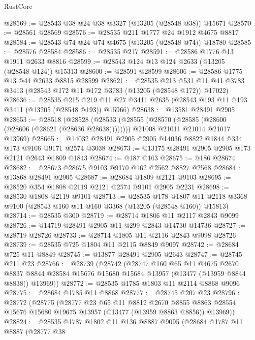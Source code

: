 \begin{lexlean}{RustCore}
\begin{coremodule}
@28569 := @28543 @38 @24 @38 @3327 (@13205 (@28548 @38)) @15671
@28570 := @28561 @28569
@28576 := @28535 @211 @1777 @24 @1912 @4675 @8817
@28584 := @28543 @74 @24 @74 @4675 (@13205 (@28548 @74)) @18780
@28585 := @28576 @28584
@28586 := @28535 @217
@28591 := @28586 @1776 @13 @1911 @2633 @8816
@28599 := @28543 @124 @13 @124 @2633 (@13205 (@28548 @124)) @15313
@28600 := @28591 @28599
@28606 := @28586 @1775 @13 @44 @2633 @8815 @28599
@28621 := @28535
    @213
    @531
    @11
    @41
    @3783
    @3413
    (@28543 @172 @11 @172 @3783 (@13205 (@28548 @172)) @17022)
@28636 := @28535
    @215
    @219
    @11
    @27
    @3411
    @2635
    (@28543 @193 @11 @193 @3411 (@13205 (@28548 @193)) @15966)
@28638 := @13581 @28491 @2905
@28653 := @28518
    (@28528
      (@28533 (@28555 (@28570 (@28585 (@28600 (@28606 (@28621 (@28636 @28638))))))))
      @21008
      @21011
      @21014
      @21017
      @13969)
@28665 := @14032 @28491 @2905 @2905 @14036 @8822 @1844 @334 @173 @9106 @9171 @2574 @3038
@28673 := @13175 @28491 @2905 @2905 @173 @2121 @2643 @1809 @1843
@28674 := @187 @163
@28675 := @186 @28674
@28682 := @28673 @28675 @9103 @9170 @162 @2562 @8827 @2568
@28684 := @13868 @28491 @2905
@28687 := @28684 @1809 @2121 @9103
@28695 := @28520 @354 @1808 @2119 @2121 @2574 @9101 @2905 @2231
@28698 := @28530 @1808 @2119 @9101
@28713 := @28535
    @178
    @1807
    @11
    @2118
    @3368
    @9100
    (@28543 @160 @11 @160 @3368 (@13205 (@28548 @160)) @15813)
@28714 := @28535 @300
@28719 := @28714 @1806 @11 @2117 @2843 @9099
@28726 := @14719 @28491 @2905 @11 @299 @2843 @14730 @14736
@28727 := @28719 @28726
@28733 := @28714 @1805 @11 @2116 @2843 @9098 @28726
@28739 := @28535 @725 @1804 @11 @2115 @8849 @9097
@28742 := @28684 @725 @11 @8849
@28745 := @13877 @28491 @2905 @2643
@28747 := @28745 @211 @23
@28766 := @28739
    (@28742
      (@28747
        @160
        @65
        @11
        @4675
        @2670
        @8837
        @8844
        @28584
        @15676
        @15680
        @15684
        @13957
        (@13477 (@13959 @8844 @8838))
        @13969))
@28772 := @28535 @1785 @1803 @11 @2114 @8868 @9096
@28775 := @28684 @1785 @11 @8868
@28777 := @28745 @207 @23
@28796 := @28772
    (@28775
      (@28777
        @23
        @65
        @11
        @8812
        @2670
        @8855
        @8863
        @28554
        @15676
        @15680
        @19675
        @13957
        (@13477 (@13959 @8863 @8856))
        @13969))
@28824 := @28535
    @1787
    @1802
    @11
    @136
    @8887
    @9095
    (@28684
      @1787
      @11
      @8887
      (@28777
        @38

\end{coremodule}
\end{lexlean}
